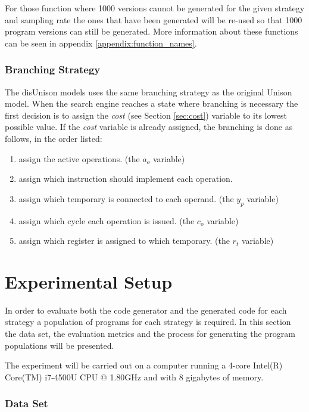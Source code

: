 For those function where 1000 versions cannot be generated for the given strategy and
sampling rate the ones that have been generated will be re-used so that 1000 program
versions can still be generated. More information about these functions can be seen in
appendix \ref{appendix:function_names}.

\subsection{Branching Strategy}
\label{sec:branch_strategy}

The disUnison models uses the same branching strategy as the original Unison model. When
the search engine reaches a state where branching is necessary the first decision is to
assign the \textit{cost} (see Section \ref{sec:cost}) variable to its lowest possible
value. If the \textit{cost} variable is already assigned, the branching is done as
follows, in the order listed:

\begin{enumerate}
	\item assign the active operations. (the $a_o$ variable)
	\item assign which instruction should implement each operation.
	\item assign which temporary is connected to each operand. (the $y_p$ variable)
	\item assign which cycle each operation is issued. (the $c_o$ variable)
	\item assign which register is assigned to which temporary. (the $r_t$ variable)
\end{enumerate}

\chapter{Experimental Setup}

In order to evaluate both the code generator and the generated code for each strategy a
population of programs for each strategy is required. In this section the data set, the
evaluation metrics and the process for generating the program populations will be
presented.

The experiment will be carried out on a computer running a 4-core Intel(R) Core(TM)
i7-4500U CPU @ 1.80GHz and with 8 gigabytes of memory.

\subsection{Data Set}

